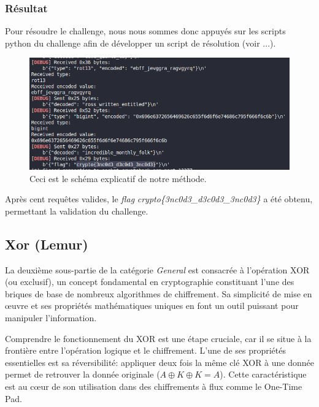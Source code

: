\documentclass[12pt, a4paper]{article}
\begin{document}
    \subsubsection{Résultat}
    Pour résoudre le challenge, nous nous sommes donc appuyés sur les scripts
    python du challenge afin de développer un script de résolution (voir ...).

    \begin{figure}[H]
        \centering
        \includegraphics[width=0.8\linewidth]{Images/Encode/encode_chall_result.png}

        \caption{Ceci est le schéma explicatif de notre méthode.}

        \label{fig:encodeChallRes}
    \end{figure}

    Après cent requêtes valides, le \textit{flag}
    \textit{crypto\{3nc0d3\_d3c0d3\_3nc0d3\}} a été obtenu, permettant la
    validation du challenge.

    \subsection{Xor (Lemur)}
    La deuxième sous-partie de la catégorie \textit{General} est consacrée à
    l'opération XOR (ou exclusif), un concept fondamental en cryptographie
    constituant l'une des briques de base de nombreux algorithmes de
    chiffrement. Sa simplicité de mise en œuvre et ses propriétés mathématiques
    uniques en font un outil puissant pour manipuler l'information.

    Comprendre le fonctionnement du XOR est une étape cruciale, car il se situe
    à la frontière entre l'opération logique et le chiffrement. L'une de ses
    propriétés essentielles est sa réversibilité: appliquer deux fois la même
    clé XOR à une donnée permet de retrouver la donnée originale
    ($A \oplus K \oplus K = A$). Cette caractéristique est au cœur de son
    utilisation dans des chiffrements à flux comme le One-Time Pad.
\end{document}
